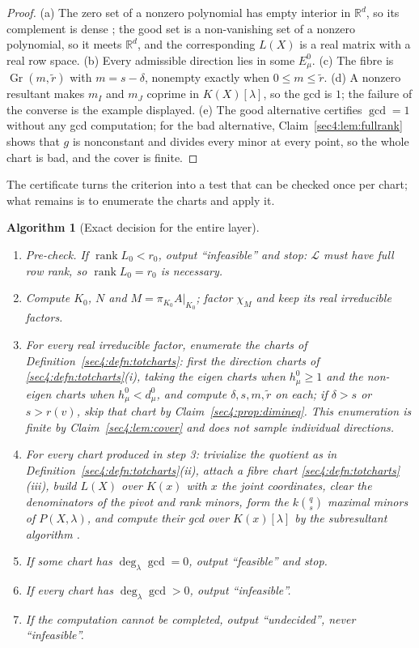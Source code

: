 \documentclass[journal]{IEEEtran}
\theoremstyle{plainn}
\newtheorem{algo}{Algorithm}
\theoremstyle{remark}
\newcommand{\rank}{\operatorname{rank}}
\newcommand{\Gr}{\operatorname{Gr}}
\begin{document}
\begin{proof}
(a) The zero set of a nonzero polynomial has empty interior in $\mathbb R^d$, so its complement is
dense \cite{bpr06}; the good set is a non-vanishing set of a nonzero polynomial, so it meets
$\mathbb R^d$, and the corresponding $L(X)$ is a real matrix with a real row space.
(b) Every admissible direction lies in some $E_\mu^0$.
(c) The fibre is $\Gr(m,\widetilde r)$ with $m=s-\delta$, nonempty exactly when
$0\le m\le\widetilde r$.
(d) A nonzero resultant makes $m_I$ and $m_J$ coprime in $K(X)[\lambda]$, so the gcd is $1$; the
failure of the converse is the example displayed.
(e) The good alternative certifies $\gcd=1$ without any gcd computation; for the bad alternative,
Claim~\ref{sec4:lem:fullrank} shows that $g$ is nonconstant and divides every minor at every point, so
the whole chart is bad, and the cover is finite.
\end{proof}


The certificate turns the criterion into a test that can be checked once per chart; what remains is to
enumerate the charts and apply it.

\begin{algo}[Exact decision for the entire layer]
\label{sec4:algo:decide}
\begin{enumerate}
\item \emph{Pre-check.} If $\rank L_0<r_0$, output ``infeasible'' and stop: $\mathcal L$ must have
full row rank, so $\rank L_0=r_0$ is necessary.
\item Compute $K_0$, $N$ and $M=\pi_{K_0}A|_{K_0}$; factor $\chi_M$ and keep its real irreducible
factors.
\item For every real irreducible factor, enumerate the charts of Definition~\ref{sec4:defn:totcharts}:
first the direction charts of \ref{sec4:defn:totcharts}(i), taking the eigen charts when
$h_\mu^0\ge1$ and the non-eigen charts when $h_\mu^0<d_\mu^0$, and compute $\delta,s,m,\widetilde r$ on
each; if $\delta>s$ or $s>r(v)$, skip that chart by Claim~\ref{sec4:prop:dimineq}. This
enumeration is finite by Claim~\ref{sec4:lem:cover} and does \emph{not} sample individual directions.
\item For every chart produced in step 3: trivialize the quotient as in
Definition~\ref{sec4:defn:totcharts}(ii), attach a fibre chart \ref{sec4:defn:totcharts}(iii), build
$L(X)$ over $K(x)$ with $x$ the joint coordinates, clear the denominators of the pivot and rank minors,
form the $k\binom{q}{s}$ maximal minors of $P(X,\lambda)$, and compute their gcd over $K(x)[\lambda]$
by the subresultant algorithm \cite{vzgg03}.
\item If some chart has $\deg_\lambda\gcd=0$, output ``feasible'' and stop.
\item If every chart has $\deg_\lambda\gcd>0$, output ``infeasible''.
\item If the computation cannot be completed, output ``undecided'', never ``infeasible''.
\end{enumerate}
\end{algo}
\end{document}

